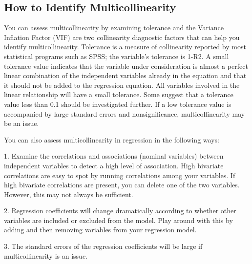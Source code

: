 \documentclass[a4paper,12pt]{article}
\begin{document}
\subsection{How to Identify Multicollinearity}

     You can assess multicollinearity by examining tolerance and the Variance Inflation Factor (VIF) are two collinearity diagnostic factors that can help you identify multicollinearity. Tolerance is a measure of collinearity reported by most statistical programs such as SPSS; the variable’s tolerance is 1-R2. A small tolerance value indicates that the variable under consideration is almost a perfect linear combination of the independent variables already in the equation and that it should not be added to the regression equation. All variables involved in the linear relationship will have a small tolerance. Some suggest that a tolerance value less than 0.1 should be investigated further. If a low tolerance value is accompanied by large standard errors and nonsignificance, multicollinearity may be an issue.
%
%

You can also assess multicollinearity in regression in the following ways:

1. Examine the correlations and associations (nominal variables) between independent variables to detect a high level of association. High bivariate correlations are easy to spot by running correlations among your variables. If high bivariate correlations are present, you can delete one of the two variables. However, this may not always be sufficient.

2. Regression coefficients will change dramatically according to whether other variables are included or excluded from the model. Play around with this by adding and then removing variables from your regression model.

3. The standard errors of the regression coefficients will be large if multicollinearity is an issue.
\end{document}

